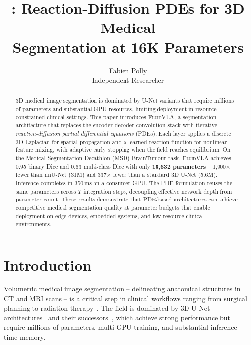 \documentclass{article}
\title{\fluidvla{}: Reaction-Diffusion PDEs for 3D Medical\\Segmentation at 16K Parameters}
\author{
  Fabien Polly \\
  Independent Researcher \\
}
\newcommand{\fluidvla}{\textsc{FluidVLA}}
\begin{document}
\maketitle

\begin{abstract}
3D medical image segmentation is dominated by U-Net variants that require millions of parameters and substantial GPU resources, limiting deployment in resource-constrained clinical settings. This paper introduces \fluidvla{}, a segmentation architecture that replaces the encoder-decoder convolution stack with iterative \emph{reaction-diffusion partial differential equations} (PDEs). Each layer applies a discrete 3D Laplacian for spatial propagation and a learned reaction function for nonlinear feature mixing, with adaptive early stopping when the field reaches equilibrium. On the Medical Segmentation Decathlon (MSD) BrainTumour task, \fluidvla{} achieves 0.95 binary Dice and 0.63 multi-class Dice with only \textbf{16,632 parameters} -- 1,900$\times$ fewer than nnU-Net (31M) and 337$\times$ fewer than a standard 3D U-Net (5.6M). Inference completes in 350\,ms on a consumer GPU. The PDE formulation reuses the same parameters across $T$ integration steps, decoupling effective network depth from parameter count. These results demonstrate that PDE-based architectures can achieve competitive medical segmentation quality at parameter budgets that enable deployment on edge devices, embedded systems, and low-resource clinical environments.
\end{abstract}

\section{Introduction}
\label{sec:introduction}

Volumetric medical image segmentation -- delineating anatomical structures in CT and MRI scans -- is a critical step in clinical workflows ranging from surgical planning to radiation therapy~\cite{isensee2021nnunet}. The field is dominated by 3D U-Net architectures~\cite{cciccek20163dunet} and their successors~\cite{hatamizadeh2022swinunetr,roy2023mednext}, which achieve strong performance but require millions of parameters, multi-GPU training, and substantial inference-time memory.
\end{document}
